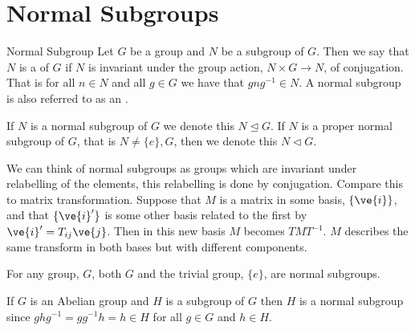 \documentclass[fleqn]{NotesClass}
\newcommand*{\normalsubgroup}{\vartriangleleft}
\newcommand*{\normalsubgroupeq}{\trianglelefteq}
\begin{document}
    \section{Normal Subgroups}
    \begin{dfn}{Normal Subgroup}{}
        Let \(G\) be a group and \(N\) be a subgroup of \(G\).
        Then we say that \(N\) is a  of \(G\) if \(N\) is invariant under the group action, \(N \times G \to N\), of conjugation.
        That is for all \(n \in N\) and all \(g \in G\) we have that \(g n g^{-1} \in N\).
        A normal subgroup is also referred to as an .
        
        \begin{ntn}{}{}
            If \(N\) is a normal subgroup of \(G\) we denote this \(N \normalsubgroupeq G\).
            If \(N\) is a proper normal subgroup of \(G\), that is \(N \ne \{e\}, G\), then we denote this \(N \normalsubgroup G\).
        \end{ntn}
    \end{dfn}
    
    We can think of normal subgroups as groups which are invariant under relabelling of the elements, this relabelling is done by conjugation.
    Compare this to matrix transformation.
    Suppose that \(M\) is a matrix in some basis, \(\{\ve{i}\}\), and that \(\{\ve{i}'\}\) is some other basis related to the first by \(\ve{i}' = T_{ij}\ve{j}\).
    Then in this new basis \(M\) becomes \(TMT^{-1}\).
    \(M\) describes the same transform in both bases but with different components.
    
    \begin{exm}{}{}
        For any group, \(G\), both \(G\) and the trivial group, \(\{e\}\), are normal subgroups.
        
        If \(G\) is an Abelian group and \(H\) is a subgroup of \(G\) then \(H\) is a normal subgroup since \(ghg^{-1} = gg^{-1}h = h \in H\) for all \(g \in G\) and \(h \in H\).
    \end{exm}
    
\end{document}
